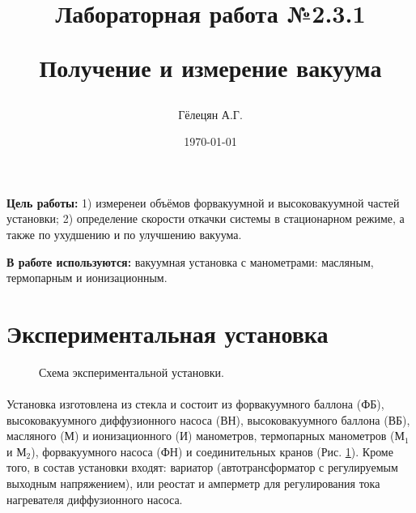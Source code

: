 \documentclass{article}
\title{\begin{center}Лабораторная работа №2.3.1\end{center}
Получение и измерение вакуума}
\author{Гёлецян А.Г.}
\date{\today}
\begin{document}
    \maketitle
    \newpage

    \textbf{Цель работы:} 1) измеренеи объёмов форвакуумной и высоковакуумной частей установки; 2) определение скорости откачки системы в стационарном режиме, а также по ухудшению и по улучшению вакуума.

    \textbf{В работе используются:} вакуумная установка с манометрами: масляным, термопарным и ионизационным.

    \section{Экспериментальная установка}

    \begin{figure}[h]
        \caption{Схема экспериментальной установки.}
        \label{ris:ustanovka}
    \end{figure}

    \paragraph{}
    Установка изготовлена из стекла и состоит из форвакуумного баллона (ФБ), высоковакуумного диффузионного насоса (ВН), высоковакуумного баллона (ВБ), масляного (М) и ионизационного (И) манометров, термопарных манометров ($М_1$ и $М_2$), форвакуумного насоса (ФН) и соединительных кранов (Рис. \ref{ris:ustanovka}). Кроме того, в состав установки входят: вариатор (автотрансформатор с регулируемым выходным напряжением), или реостат и амперметр для регулирования тока нагревателя диффузионного насоса.
\end{document}
